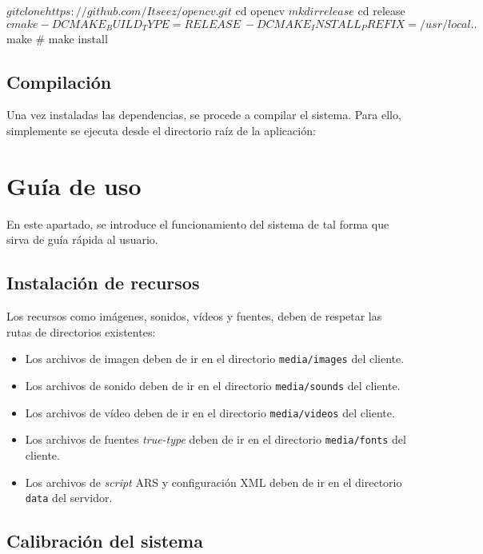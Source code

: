 \begin{listing}[%
  style=consola]
$ git clone https://github.com/Itseez/opencv.git
$ cd opencv
$ mkdir release
$ cd release
$ cmake -D CMAKE_BUILD_TYPE=RELEASE \
  -D CMAKE_INSTALL_PREFIX=/usr/local ..
$ make
# make install
\end{listing}

\subsection{Compilación}

Una vez instaladas las dependencias, se procede a compilar el sistema. Para ello, simplemente se
ejecuta desde el directorio raíz de la aplicación:


\section{Guía de uso}

En este apartado, se introduce el funcionamiento del sistema de tal forma que sirva de guía rápida al
usuario.

\subsection{Instalación de recursos}

Los recursos como imágenes, sonidos, vídeos y fuentes, deben de respetar las rutas de directorios
existentes:

\begin{itemize}
\item Los archivos de imagen deben de ir en el directorio \texttt{media/images} del cliente.
\item Los archivos de sonido deben de ir en el directorio \texttt{media/sounds} del cliente.
\item Los archivos de vídeo deben de ir en el directorio \texttt{media/videos} del cliente.
\item Los archivos de fuentes \textit{true-type} deben de ir en el directorio \texttt{media/fonts}
  del cliente.
\item Los archivos de \textit{script} ARS y configuración XML deben de ir en el
  directorio \texttt{data} del servidor.
\end{itemize}

\subsection{Calibración del sistema}

